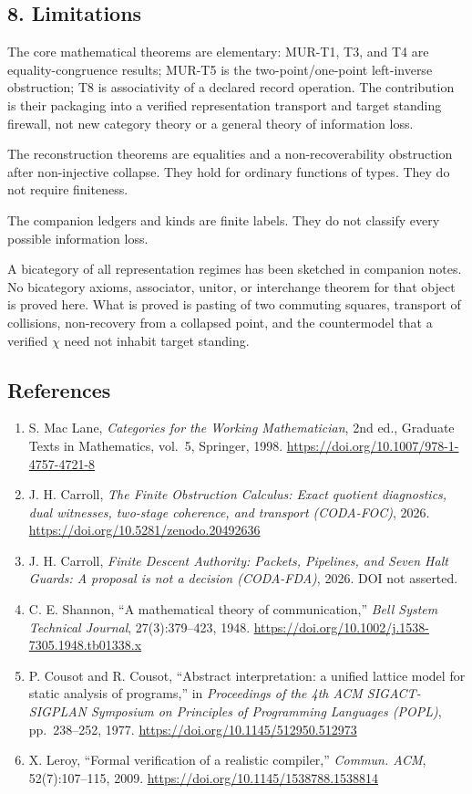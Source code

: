 \documentclass[
  11pt,
]{article}
\providecommand{\tightlist}{%
  \setlength{\itemsep}{0pt}\setlength{\parskip}{0pt}}
\begin{document}
\subsection{8. Limitations}\label{limitations}

The core mathematical theorems are elementary: MUR-T1, T3, and T4 are equality-congruence results; MUR-T5 is the two-point/one-point left-inverse obstruction; T8 is associativity of a declared record operation. The contribution is their packaging into a verified representation transport and target standing firewall, not new category theory or a general theory of information loss.

The reconstruction theorems are equalities and a non-recoverability obstruction after non-injective collapse. They hold for ordinary functions of types. They do not require finiteness.

The companion ledgers and kinds are finite labels. They do not classify every possible information loss.

A bicategory of all representation regimes has been sketched in companion notes. No bicategory axioms, associator, unitor, or interchange theorem for that object is proved here. What is proved is pasting of two commuting squares, transport of collisions, non-recovery from a collapsed point, and the countermodel that a verified \(\chi\) need not inhabit target standing.

\subsection{References}\label{references}

\begin{enumerate}
\def\labelenumi{\arabic{enumi}.}
\tightlist
\item
  S. Mac Lane, \emph{Categories for the Working Mathematician}, 2nd ed., Graduate Texts in Mathematics, vol.~5, Springer, 1998. \url{https://doi.org/10.1007/978-1-4757-4721-8}
\item
  J. H. Carroll, \emph{The Finite Obstruction Calculus: Exact quotient diagnostics, dual witnesses, two-stage coherence, and transport (CODA-FOC)}, 2026. \url{https://doi.org/10.5281/zenodo.20492636}
\item
  J. H. Carroll, \emph{Finite Descent Authority: Packets, Pipelines, and Seven Halt Guards: A proposal is not a decision (CODA-FDA)}, 2026. DOI not asserted.
\item
  C. E. Shannon, ``A mathematical theory of communication,'' \emph{Bell System Technical Journal}, 27(3):379--423, 1948. \url{https://doi.org/10.1002/j.1538-7305.1948.tb01338.x}
\item
  P. Cousot and R. Cousot, ``Abstract interpretation: a unified lattice model for static analysis of programs,'' in \emph{Proceedings of the 4th ACM SIGACT-SIGPLAN Symposium on Principles of Programming Languages (POPL)}, pp.~238--252, 1977. \url{https://doi.org/10.1145/512950.512973}
\item
  X. Leroy, ``Formal verification of a realistic compiler,'' \emph{Commun. ACM}, 52(7):107--115, 2009. \url{https://doi.org/10.1145/1538788.1538814}
\end{enumerate}
\end{document}
